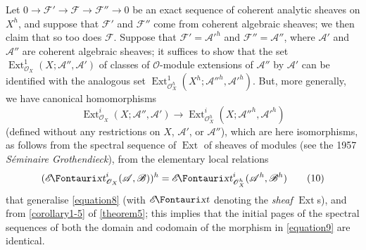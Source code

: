 \documentclass{article}
\theoremstyle{plain}
\theoremstyle{definition}
\newcommand{\sh}[1]{{\mathscr{#1}}}
\newcommand{\shExt}{\sh{E}\textup{\kern-2.2pt{\Fontauri\slshape xt}}}
\newcommand{\Ext}{\operatorname{Ext}}
\begin{document}
Let $0\to\sh{F}'\to\sh{F}\to\sh{F}''\to0$ be an exact sequence of coherent analytic sheaves on $X^h$, and suppose that $\sh{F}'$ and $\sh{F}''$ come from coherent algebraic sheaves;
we then claim that so too does $\sh{F}$.
Suppose that $\sh{F}'=\sh{A}'^h$ and $\sh{F}''=\sh{A}''$, where $\sh{A}'$ and $\sh{A}''$ are coherent algebraic sheaves;
it suffices to show that the set $\Ext_{\sh{O}_X}^1(X;\sh{A}'',\sh{A}')$ of classes of $\sh{O}$-module extensions of $\sh{A}''$ by $\sh{A}'$ can be identified with the analogous set $\Ext_{\sh{O}_X^h}^1(X^h;\sh{A}''^h,\sh{A}'^h)$.
But, more generally, we have canonical homomorphisms
\[
\label{equation9}
  \Ext_{\sh{O}_X}^i(X;\sh{A}'',\sh{A}')
  \to 
  \Ext_{\sh{O}_X^h}^i(X;\sh{A}''^h,\sh{A}'^h)
  \tag{9}
\]
(defined without any restrictions on $X$, $\sh{A}'$, or $\sh{A}''$), which are here isomorphisms, as follows from the spectral sequence of $\Ext$ of sheaves of modules (see the 1957 \emph{S\'{e}minaire Grothendieck}), from the elementary local relations
\[
\label{equation10}
  (\shExt_{\sh{O}_X}^i(\sh{A},\sh{B}))^h
  = \shExt_{\sh{O}_X^h}^i(\sh{A}^h,\sh{B}^h)
  \tag{10}
\]
that generalise \cref{equation8} (with $\shExt$ denoting the \emph{sheaf} $\Ext$s), and from \cref{corollary1-5} of \cref{theorem5};
this implies that the initial pages of the spectral sequences of both the domain and codomain of the morphism in \cref{equation9} are identical.
\end{document}
